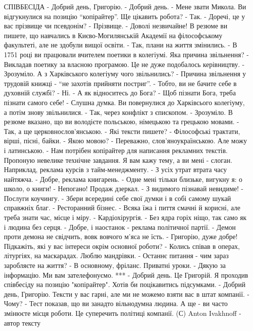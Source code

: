 \obeycr
СПІВБЕСІДА
- Добрий день, Григорію. 
- Добрий день.
- Мене звати Микола. Ви відгукнулися на позицію \enquote{копірайтер}. Ще цікавить робота?
- Так.
- Доречі, це у вас прізвище чи псевдонім?
- Прізвище.
- Доволі незвичайне! В резюме ви пишете, що навчались в Києво-Могилянській Академії на філософському факультеті, але не здобули вищої освіти.
- Так, плани на життя змінились. 
- В 1751 році ви працювали вчителем поетики в колегіумі. Яка причина звільнення?
- Викладав поетику за власною програмою. Це не дуже подобалось керівництву.
- Зрозуміло. А з Харківського колегіуму чого звільнились?
- Причина звільнення у трудовій книжці - \enquote{не захотів прийняти постриг}.
- Тобто, ви не бачите себе в духовній службі?
- Ні.
- А як відноситесь до Бога?
- Щоб пізнати Бога, треба пізнати самого себе! 
- Слушна думка. Ви повернулися до Харківсього колегіуму, а потім знову звільнилися.
- Так, через конфлікт з єпископом.
- Зрозуміло. В резюме вказано, що ви володієте польською, німецькою та грецькою мовами.
- Так, а ще церковнослов'янською.
- Які тексти пишете?
- Філософські трактати, вірші, пісні, байки.
- Якою мовою?
- Переважно, слов'яноукраїнською. Але можу і латинською.
- Нам потрібен копірайтер для написання рекламних текстів. Пропоную невелике технічне завдання. Я вам кажу тему, а ви мені - слоган. Наприклад, реклама курсів з тайм-менеджменту.
- З усіх утрат втрата часу найтяжча.
- Добре, реклама книгарень.
- Одне мені тільки близьке, вигукну я: о школо, о книги!
- Непогано! Продаж дзеркал.
- З видимого пізнавай невидиме!
- Послуги коучингу.
- Збери всередині себе свої думки і в собі самому шукай справжніх благ.
- Ресторанний бізнес.
- Всяка їжа і пиття смачні й корисні, але треба знати час, місце і міру.
- Кардіохірургія.
- Без ядра горіх ніщо, так само як і людина без серця.
- Добре, і наостанок - реклама політичної партії.
- Демон проти демона не свідчить, вовк вовчого м'яса не їсть.
- Григорію, дуже добре! Підкажіть, які у вас інтереси окрім основної роботи?
- Колись співав в операх, літургіях, на маскарадах. Люблю мандрівки.
- Останнє питання - чим зараз заробляєте на життя?
- В основному, фріланс. Приватні уроки.
- Дякую за інформацію. Ми вам зателефонуємо.
***
- Добрий день. Це Григорій. Я проходив співбесіду на позицію "копірайтер". Хотів би поцікавитись підсумками.
- Добрий день, Григорію. Тексти у вас гарні, але ми не можемо взяти вас в штат компанії.
- Чому?
- Тест показав, що ви занадто вільнодумна людина. А ще - ви часто змінюєте місця роботи. Це суперечить політиці компанії.
(С) Anton Ivakhnoff - автор тексту
\restorecr

